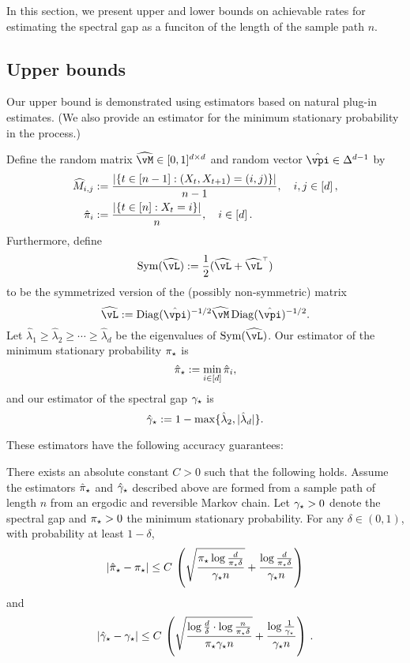 
In this section, we present upper and lower bounds on achievable rates
for estimating the spectral gap as a funciton of the length of the
sample path $n$.

\subsection{Upper bounds}
\label{sec:rates-upper}

Our upper bound is demonstrated using estimators based on natural
plug-in estimates.
(We also provide an estimator for the minimum stationary probability
in the process.)

Define the random matrix $\wh\vM \in [0,1]^{d \times d}$ and random
vector $\hat\vpi \in \Delta^{d-1}$ by
\begin{align*}
  \widehat{M}_{i,j}
  & := \frac{|\{ t \in [n-1] : (X_t,X_{t+1}) = (i,j) \}|}{n-1}
  , \quad i,j \in [d]\,,
  \\
  \hat{\pi}_i
  & := \frac{|\{ t \in [n] : X_t = i \}|}{n}
  , \quad i \in [d]
  \,.
\end{align*}
Furthermore, define
\[
  \Sym(\wh\vL) := \frac12 \parens{ \wh\vL + \wh\vL^\t }
\]
to be the symmetrized version of the (possibly non-symmetric) matrix
\[
  \wh\vL := \Diag(\hat\vpi)^{-1/2} \wh\vM \Diag(\hat\vpi)^{-1/2}
  .
\]
Let $\hat\lambda_1 \geq \hat\lambda_2 \geq \dotsb \geq \hat\lambda_d$
be the eigenvalues of $\Sym(\wh\vL)$.
Our estimator of the minimum stationary probability $\pi_{\star}$ is
\[
  \hat\pi_{\star} := \min_{i \in [d]} \hat\pi_i ,
\]
and our estimator of the spectral gap $\gamma_{\star}$ is
\[
  \hat\gamma_{\star} := 1 - \max\{ \hat\lambda_2, |\hat\lambda_d| \} .
\]

These estimators have the following accuracy guarantees:
\begin{theorem}
  \label{thm:err}
  There exists an absolute constant $C>0$ such that the following
  holds.
  Assume the estimators $\hat\pi_{\star}$ and $\hat\gamma_{\star}$ described above are
  formed from a sample path of length $n$ from an ergodic and
  reversible Markov chain.
  Let $\gamma_{\star}>0$ denote the spectral gap and $\pi_{\star}>0$ the minimum
  stationary probability.
  For any $\delta \in (0,1)$, with probability at least $1-\delta$,
  \begin{equation}\label{eq:piminbound}
    \left|\hat\pi_{\star}-\pi_{\star}\right|
    \le
    C \,
    \left(
      \sqrt{\frac{\pi_{\star}\log\frac{d}{\pi_{\star}\delta}}{\gamma_{\star} n}}
      +
      \frac{\log\frac{d}{\pi_{\star}\delta}}{\gamma_{\star} n}
    \right)
  \end{equation}
  and
  \begin{equation}\label{eq:gapbound}
    \left|\hat\gamma_{\star}-\gamma_{\star}\right|
    \leq
    C \,
    \left(
      \sqrt{\frac{\log\frac{d}{\delta}\cdot\log\frac{n}{\pi_{\star}\delta}}{\pi_{\star}\gamma_{\star} n}}
      + \frac{\log\frac{1}{\gamma_{\star}}}{\gamma_{\star} n}  
    \right)
    \,.
  \end{equation}
\end{theorem}

